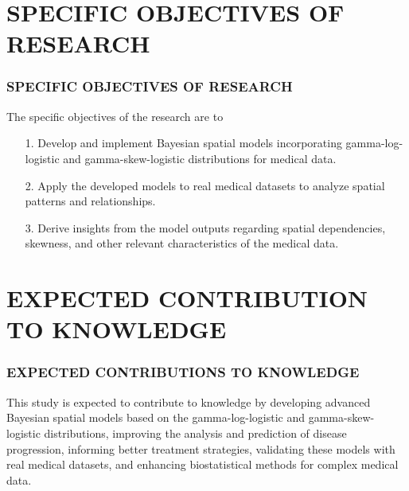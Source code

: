 \documentclass{beamer}
\begin{document}
\section{SPECIFIC OBJECTIVES OF RESEARCH}
\begin{frame}
		\frametitle{\textbf{SPECIFIC OBJECTIVES OF RESEARCH}}
		The specific objectives of the research are to \\
		
			\begin{itemize}
\item[1.] Develop and implement Bayesian spatial models incorporating gamma-log-logistic and gamma-skew-logistic distributions for medical data.
   
\item[2.] Apply the developed models to real medical datasets to analyze spatial patterns and relationships.

\item[3.] Derive insights from the model outputs regarding spatial dependencies, skewness, and other relevant characteristics of the medical data.


\end{itemize}
		
	\end{frame}





\section{EXPECTED CONTRIBUTION TO KNOWLEDGE}
\begin{frame}
		\frametitle{\textbf{EXPECTED CONTRIBUTIONS TO KNOWLEDGE}}
		This study is expected to contribute to knowledge by developing advanced Bayesian spatial models based on the gamma-log-logistic and gamma-skew-logistic distributions, improving the analysis and prediction of disease progression, informing better treatment strategies, validating these models with real medical datasets, and enhancing biostatistical methods for complex medical data.	
	\end{frame}



\end{document}
